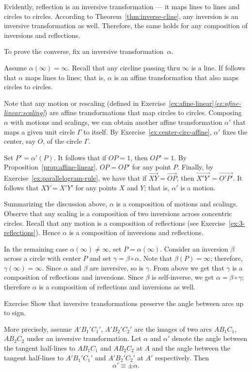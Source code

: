Evidently, reflection is an inversive transformation --- it maps lines to lines and circles to circles.
According to Theorem~\ref{thm:inverse-cline}, any inversion is an inversive transformation as well.
Therefore, the same holds for any composition of inversions and reflections.

To prove the converse, 
fix an inversive transformation~$\alpha$.

Assume $\alpha(\infty)=\infty$.
Recall that any circline passing thru $\infty$ is a line.
If follows that $\alpha$ maps lines to lines;
that is,
$\alpha$ is an affine transformation that also maps circles to circles.

Note that any motion or rescaling (defined in Exercise~\ref{ex:afine-linear}\textit{\ref{ex:afine-linear:scaling}}) are affine transformations that map circles to circles.
Composing $\alpha$ with motions and scalings, we can obtain another affine transformation $\alpha'$ that maps a given unit circle $\Gamma$ to itself.
By Exercise~\ref{ex:center-circ-affine},
$\alpha'$ fixes the center, say $O$, of the circle $\Gamma$.

Set $P'=\alpha'(P)$.
It follows that if $OP=1$, then $OP'=1$.
By Proposition~\ref{prop:affine-linear}, $OP=OP'$ for any point $P$.
Finally, by Exercise~\ref{ex:parallelogram-rule}, we have that if 
$\overrightarrow{XY}=\overrightarrow{OP}$, then $\overrightarrow{X'Y'}=\overrightarrow{O'P'}$.
It follows that $XY=X'Y'$ for any points $X$ and $Y$;
that is, $\alpha'$ is a motion.

Summarizing the discussion above, $\alpha$ is a composition of motions and scalings.
Observe that any scaling is a composition of two inversions across concentric circles.
Recall that any motion is a composition of reflections (see Exercise~\ref{ex:3-reflections}).
Hence $\alpha$ is a composition of inversions and reflections.


In the remaining case $\alpha(\infty)\ne \infty$, set $P=\alpha(\infty)$.
Consider an inversion $\beta$ across a circle with center $P$ and set $\gamma=\beta\circ\alpha$.
Note that $\beta(P)=\infty$; 
therefore, $\gamma(\infty)=\infty$.
Since $\alpha$ and $\beta$ are inversive, so is $\gamma$.
From above we get that $\gamma$ is a composition of reflections and inversions.
Since $\beta$ is self-inverse, we get
$\alpha=\beta\circ\gamma$;
therefore $\alpha$ is a composition of reflections and inversions as well.
\qeds

\begin{thm}{Exercise}\label{ex:inversive-angle}
Show that inversive transformations preserve the angle between arcs up to sign.

More precisely, assume $A'B_1'C_1'$, $A'B_2'C_2'$ are the images of two arcs $AB_1C_1$, $AB_2C_2$ under an inversive transformation.
Let $\alpha$ and $\alpha'$ denote the angle between the tangent half-lines to $AB_1C_1$ and $AB_2C_2$ at $A$
and the angle between the tangent half-lines to $A'B_1'C_1'$ and $A'B_2'C_2'$ at $A'$ respectively.
Then 
\[\alpha'\equiv\pm \alpha.\]
\end{thm}


